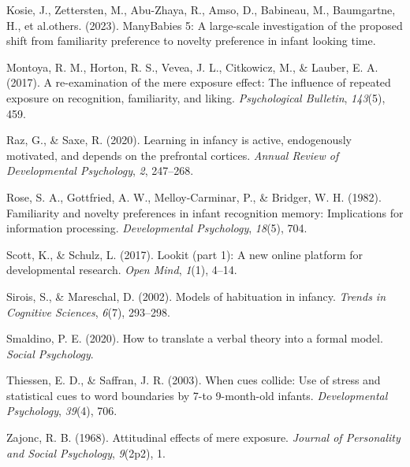 \documentclass[10pt, letterpaper]{article}
\newenvironment{CSLReferences}%
  {}%
  {\par}
\begin{document}
\begin{CSLReferences}{1}{0}
\leavevmode{}%
Kosie, J., Zettersten, M., Abu-Zhaya, R., Amso, D., Babineau, M.,
Baumgartne, H., et al.others. (2023). ManyBabies 5: A large-scale
investigation of the proposed shift from familiarity preference to
novelty preference in infant looking time.

\leavevmode{}%
Montoya, R. M., Horton, R. S., Vevea, J. L., Citkowicz, M., \& Lauber,
E. A. (2017). A re-examination of the mere exposure effect: The
influence of repeated exposure on recognition, familiarity, and liking.
\emph{Psychological Bulletin}, \emph{143}(5), 459.

\leavevmode{}%
Raz, G., \& Saxe, R. (2020). Learning in infancy is active, endogenously
motivated, and depends on the prefrontal cortices. \emph{Annual Review
of Developmental Psychology}, \emph{2}, 247--268.

\leavevmode{}%
Rose, S. A., Gottfried, A. W., Melloy-Carminar, P., \& Bridger, W. H.
(1982). Familiarity and novelty preferences in infant recognition
memory: Implications for information processing. \emph{Developmental
Psychology}, \emph{18}(5), 704.

\leavevmode{}%
Scott, K., \& Schulz, L. (2017). Lookit (part 1): A new online platform
for developmental research. \emph{Open Mind}, \emph{1}(1), 4--14.

\leavevmode{}%
Sirois, S., \& Mareschal, D. (2002). Models of habituation in infancy.
\emph{Trends in Cognitive Sciences}, \emph{6}(7), 293--298.

\leavevmode{}%
Smaldino, P. E. (2020). How to translate a verbal theory into a formal
model. \emph{Social Psychology}.

\leavevmode{}%
Thiessen, E. D., \& Saffran, J. R. (2003). When cues collide: Use of
stress and statistical cues to word boundaries by 7-to 9-month-old
infants. \emph{Developmental Psychology}, \emph{39}(4), 706.

\leavevmode{}%
Zajonc, R. B. (1968). Attitudinal effects of mere exposure.
\emph{Journal of Personality and Social Psychology}, \emph{9}(2p2), 1.

\end{CSLReferences}


\end{document}
